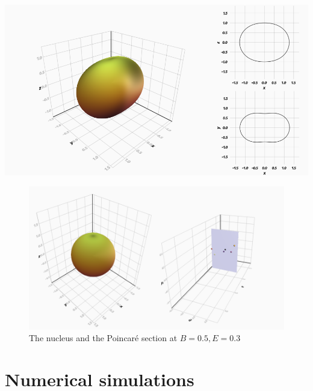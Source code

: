 \documentclass{beamer}
\begin{document}
\begin{frame}
	\includegraphics[width=\textwidth]{nucleus-with-sections}
\end{frame}


\begin{frame}
	\begin{figure}
		\includegraphics[width=\textwidth]{nucleus-with-poincare}
		\caption{The nucleus and the Poincaré section at \(B=0.5, E=0.3\)}
	\end{figure}
\end{frame}

\section{Numerical simulations}

\end{document}
